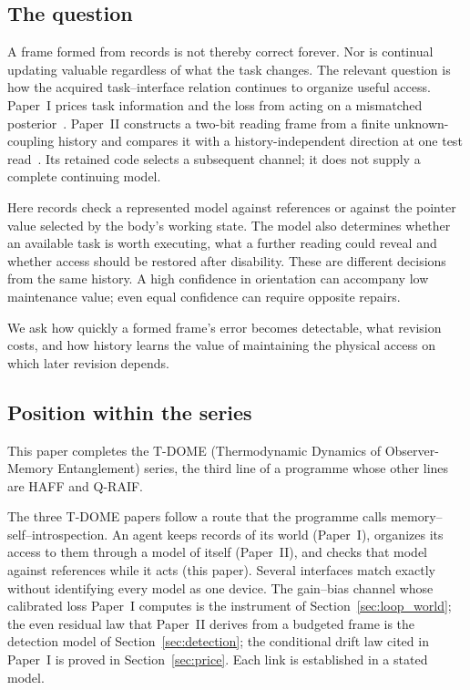 \documentclass[12pt]{article}
\theoremstyle{definition}
\begin{document}
\subsection{The question}
\label{subsec:question}

A frame formed from records is not thereby correct forever.
Nor is continual updating valuable regardless of what the task changes.
The relevant question is how the acquired task--interface relation
continues to organize useful access.
Paper~I prices task information and the loss from acting on a mismatched
posterior~\cite{Liu2026TDOME_I}.
Paper~II constructs a two-bit reading frame from a finite unknown-coupling
history and compares it with a history-independent direction at one
test read~\cite{Liu2026TDOME_II}.
Its retained code selects a subsequent channel; it does not supply a
complete continuing model.

Here records check a represented model against references or against
the pointer value selected by the body's working state.
The model also determines whether an available task is worth
executing, what a further reading could reveal and whether access
should be restored after disability.
These are different decisions from the same history.
A high confidence in orientation can accompany low maintenance value;
even equal confidence can require opposite repairs.

We ask how quickly a formed frame's error becomes detectable, what
revision costs, and how history learns the value of maintaining
the physical access on which later revision depends.

\subsection{Position within the series}
\label{subsec:sequence}

This paper completes the T-DOME (Thermodynamic Dynamics of Observer-Memory Entanglement) series, the third line of a programme whose other lines are HAFF and Q-RAIF.



The three T-DOME papers follow a route that the programme calls memory--self--\allowbreak introspection. An agent keeps records of its world (Paper~I), organizes its access to them through a model of itself (Paper~II), and checks that model against references while it acts (this paper). Several interfaces match exactly without identifying every model as one device. The gain--bias channel whose calibrated loss Paper~I computes is the instrument of Section~\ref{sec:loop_world}; the even residual law that Paper~II derives from a budgeted frame is the detection model of Section~\ref{sec:detection}; the conditional drift law cited in Paper~I is proved in Section~\ref{sec:price}. Each link is established in a stated model.
\end{document}
